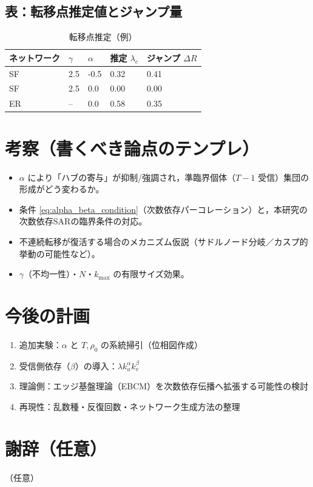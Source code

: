 \documentclass[uplatex,dvipdfmx,11pt]{bxjsarticle}
\begin{document}
\subsection{表：転移点推定値とジャンプ量}
\begin{table}[htbp]
  \centering
  \caption{転移点推定（例）}
  \label{tab:critical}
  \begin{tabular}{@{}lllll@{}}
    \toprule
    ネットワーク & $\gamma$ & $\alpha$ & 推定 $\lambda_c$ & ジャンプ $\Delta R$ \\ \midrule
    SF & 2.5 & -0.5 & 0.32 & 0.41 \\
    SF & 2.5 & 0.0  & 0.00 & 0.00 \\
    ER & --  & 0.0  & 0.58 & 0.35 \\
    \bottomrule
  \end{tabular}
\end{table}

\section{考察（書くべき論点のテンプレ）}
\begin{itemize}[leftmargin=2em]
  \item $\alpha$ により「ハブの寄与」が抑制/強調され，準臨界個体（$T-1$ 受信）集団の形成がどう変わるか。
  \item 条件 \cref{eq:alpha_beta_condition}（次数依存パーコレーション）と，本研究の次数依存SARの臨界条件の対応。
  \item 不連続転移が復活する場合のメカニズム仮説（サドルノード分岐／カスプ的挙動の可能性など）。
  \item $\gamma$（不均一性）・$N$・$k_{\max}$ の有限サイズ効果。
\end{itemize}

\section{今後の計画}
\begin{enumerate}[leftmargin=2em]
  \item 追加実験：$\alpha$ と $T,\rho_0$ の系統掃引（位相図作成）
  \item 受信側依存（$\beta$）の導入：$\lambda k_u^\alpha k_v^\beta$
  \item 理論側：エッジ基盤理論（EBCM）を次数依存伝播へ拡張する可能性の検討
  \item 再現性：乱数種・反復回数・ネットワーク生成方法の整理
\end{enumerate}

\section*{謝辞（任意）}
（任意）

\printbibliography
\end{document}
